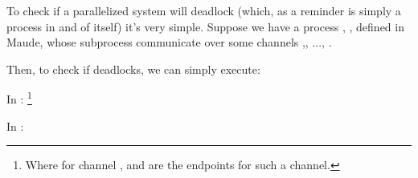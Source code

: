 To check if a parallelized system will deadlock (which, as a reminder is simply a process in and of itself) it's very simple. Suppose we have a process , , defined in Maude, whose subprocess communicate over some channels ,, ..., .

Then, to check if  deadlocks, we can simply execute:

\bi
    \item In  :  \footnote{Where for channel ,  and  are the endpoints for such a channel.}
    \item In : 
\ei

